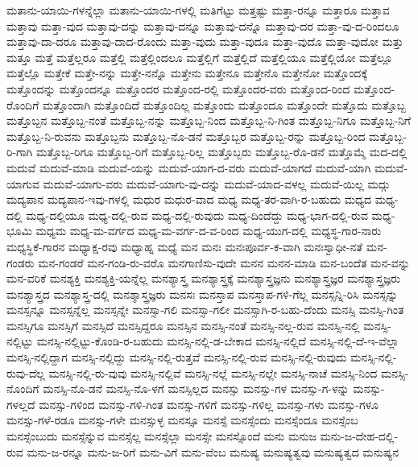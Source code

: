 {ಮತಾನು-ಯಾಯಿ-ಗಳನ್ನೆಲ್ಲಾ
ಮತಾನು-ಯಾಯಿ-ಗಳಲ್ಲಿ
ಮತಿಗೆಟ್ಟು
ಮತ್ತಷ್ಟು
ಮತ್ತಾ-ರನ್ನೂ
ಮತ್ತಾರೂ
ಮತ್ತಾವ
ಮತ್ತಾವು
ಮತ್ತಾ-ವುದ
ಮತ್ತಾವು-ದನ್ನು
ಮತ್ತಾವು-ದನ್ನೂ
ಮತ್ತಾವು-ದನ್ನೊ
ಮತ್ತಾವು-ದರ
ಮತ್ತಾ-ವು-ದ-ರಿಂದಲೂ
ಮತ್ತಾವು-ದಾ-ದರೂ
ಮತ್ತಾವು-ದಾದ-ರೊಂದು
ಮತ್ತಾ-ವುದು
ಮತ್ತಾ-ವುದೂ
ಮತ್ತಾ-ವುದೊ
ಮತ್ತಾ-ವುದೋ
ಮತ್ತು
ಮತ್ತೂ
ಮತ್ತೆ
ಮತ್ತೆಲ್ಲರೂ
ಮತ್ತೆಲ್ಲಿ
ಮತ್ತೆಲ್ಲಿಂದಲೂ
ಮತ್ತೆಲ್ಲಿಗೆ
ಮತ್ತೆಲ್ಲಿದೆ
ಮತ್ತೆಲ್ಲಿಯೂ
ಮತ್ತೆಲ್ಲಿಯೋ
ಮತ್ತೆಲ್ಲೂ
ಮತ್ತೆಲ್ಲೊ
ಮತ್ತೇಕೆ
ಮತ್ತೇ-ನನ್ನು
ಮತ್ತೇ-ನನ್ನೊ
ಮತ್ತೇನು
ಮತ್ತೇನೂ
ಮತ್ತೇನೊ
ಮತ್ತೇನೋ
ಮತ್ತೊಂದಕ್ಕೆ
ಮತ್ತೊಂದನ್ನು
ಮತ್ತೊಂದನ್ನೂ
ಮತ್ತೊಂದರ
ಮತ್ತೊಂದ-ರಲ್ಲಿ
ಮತ್ತೊಂದರ-ವರು
ಮತ್ತೊಂದ-ರಿಂದ
ಮತ್ತೊಂದ-ರೊಂದಿಗೆ
ಮತ್ತೊಂದಾಗಿ
ಮತ್ತೊಂದಿದೆ
ಮತ್ತೊಂದಿಲ್ಲ
ಮತ್ತೊಂದು
ಮತ್ತೊಂದೂ
ಮತ್ತೊಂದೇ
ಮತ್ತೊದು
ಮತ್ತೊಬ್ಬ
ಮತ್ತೊಬ್ಬನ
ಮತ್ತೊಬ್ಬ-ನಂತೆ
ಮತ್ತೊಬ್ಬ-ನನ್ನು
ಮತ್ತೊಬ್ಬ-ನಿಂದ
ಮತ್ತೊಬ್ಬ-ನಿ-ಗಿಂತ
ಮತ್ತೊಬ್ಬ-ನಿಗೂ
ಮತ್ತೊಬ್ಬ-ನಿಗೆ
ಮತ್ತೊಬ್ಬ-ನಿ-ರುವನು
ಮತ್ತೊಬ್ಬನು
ಮತ್ತೊಬ್ಬ-ನೊ-ಡನೆ
ಮತ್ತೊಬ್ಬರ
ಮತ್ತೊಬ್ಬ-ರನ್ನು
ಮತ್ತೊಬ್ಬ-ರಿಂದ
ಮತ್ತೊಬ್ಬ-ರಿ-ಗಾಗಿ
ಮತ್ತೊಬ್ಬ-ರಿಗೂ
ಮತ್ತೊಬ್ಬ-ರಿಗೆ
ಮತ್ತೊಬ್ಬ-ರಿಲ್ಲ
ಮತ್ತೊಬ್ಬರು
ಮತ್ತೊಬ್ಬ-ರೊ-ಡನೆ
ಮತ್ತೊಮ್ಮೆ
ಮದ-ದಲ್ಲಿ
ಮದುವೆ
ಮದುವೆ-ಮಾಡಿ
ಮದುವೆ-ಯನ್ನು
ಮದುವೆ-ಯಾಗ-ದ-ವರು
ಮದುವೆ-ಯಾಗದೆ
ಮದುವೆ-ಯಾಗಿ
ಮದುವೆ-ಯಾಗುವ
ಮದುವೆ-ಯಾಗು-ವರು
ಮದುವೆ-ಯಾಗು-ವು-ದನ್ನು
ಮದುವೆ-ಯಾದ-ವಳಲ್ಲ
ಮದುವೆ-ಯಿಲ್ಲ
ಮದ್ಗು
ಮದ್ಯಪಾನ
ಮದ್ಯಪಾನ-ಇವು-ಗಳಲ್ಲಿ
ಮಧುರ
ಮಧುರ-ವಾದ
ಮಧ್ಯ
ಮಧ್ಯ-ತರ-ವಾಗಿ-ರ-ಬಹುದು
ಮಧ್ಯದ
ಮಧ್ಯ-ದಲ್ಲಿ
ಮಧ್ಯ-ದಲ್ಲಿಯೂ
ಮಧ್ಯ-ದಲ್ಲಿ-ರುವ
ಮಧ್ಯ-ದಲ್ಲಿ-ರುವುದು
ಮಧ್ಯ-ದಿಂದೆದ್ದು
ಮಧ್ಯ-ಭಾಗ-ದಲ್ಲಿ-ರುವ
ಮಧ್ಯ-ಭೂಮಿ
ಮಧ್ಯಮ
ಮಧ್ಯ-ಮ-ವರ್ಗದ
ಮಧ್ಯ-ಮ-ವರ್ಗ-ದ-ವ-ರಿಂದ
ಮಧ್ಯ-ಯುಗ-ದಲ್ಲಿ
ಮಧ್ಯಸ್ಥ-ಗಾರ-ನಾರು
ಮಧ್ಯಸ್ಥಿಕೆ-ಗಾರನ
ಮಧ್ಯಾಕ್ಷ-ರವು
ಮಧ್ಯಾಹ್ನ
ಮಧ್ಯೆ
ಮನ
ಮನಃ
ಮನಃಪೂರ್ವ-ಕ-ವಾಗಿ
ಮನಃಸ್ವಾಧೀ-ನತೆ
ಮನ-ಗಂಡರು
ಮನ-ಗಂಡರೆ
ಮನ-ಗಂಡಿ-ರು-ವರೊ
ಮನಗಾಣಿಸು-ವುದೇ
ಮನನ
ಮನನ-ಮಾಡಿ
ಮನ-ಬಂದೆತ
ಮನ-ವನ್ನು
ಮನ-ವರಿಕೆ
ಮನಶ್ಯಕ್ತಿ
ಮನಶ್ಯಕ್ತಿ-ಯನ್ನೆಲ್ಲ
ಮನಶ್ಯಾಸ್ತ್ರ
ಮನಶ್ಯಾಸ್ತ್ರಕ್ಕೆ
ಮನಶ್ಯಾಸ್ತ್ರಜ್ಞನು
ಮನಶ್ಯಾಸ್ತ್ರಜ್ಞರ
ಮನಶ್ಯಾಸ್ತ್ರಜ್ಞರು
ಮನಶ್ಯಾಸ್ತ್ರದ
ಮನಶ್ಯಾಸ್ತ್ರ-ದಲ್ಲಿ
ಮನಶ್ಶಾಸ್ತ್ರಜ್ಞರು
ಮನಸಃ
ಮನಸ್ತಾಪ
ಮನಸ್ತಾಪ-ಗಳಿ-ಗೆಲ್ಲ
ಮನಸ್ಸನ್ನಿ-ರಿಸಿ
ಮನಸ್ಸನ್ನು
ಮನಸ್ಸನ್ನೂ
ಮನಸ್ಸನ್ನೆಲ್ಲ
ಮನಸ್ಸನ್ನೇ
ಮನಸ್ಸಾ-ಗಲಿ
ಮನಸ್ಸಾ-ಗಲೀ
ಮನಸ್ಸಾಗಿ-ರ-ಬಹು-ದೆಂದು
ಮನಸ್ಸಿ
ಮನಸ್ಸಿ-ಗಿಂತ
ಮನಸ್ಸಿಗೂ
ಮನಸ್ಸಿಗೆ
ಮನಸ್ಸಿದೆ
ಮನಸ್ಸಿದ್ದರೂ
ಮನಸ್ಸಿನ
ಮನಸ್ಸಿ-ನಂತೆ
ಮನಸ್ಸಿ-ನಲ್ಲ-ರುವ
ಮನಸ್ಸಿ-ನಲ್ಲಿ
ಮನಸ್ಸಿ-ನಲ್ಲಿಟ್ಟು
ಮನಸ್ಸಿ-ನಲ್ಲಿಟ್ಟು-ಕೊಂಡಿ-ರ-ಬಹುದು
ಮನಸ್ಸಿ-ನಲ್ಲಿ-ಡ-ಬೇಕಾದ
ಮನಸ್ಸಿ-ನಲ್ಲಿದೆ
ಮನಸ್ಸಿ-ನಲ್ಲಿ-ದೆ-ಇ-ವೆಲ್ಲಾ
ಮನಸ್ಸಿ-ನಲ್ಲಿದ್ದಾಗ
ಮನಸ್ಸಿ-ನಲ್ಲಿದ್ದು
ಮನಸ್ಸಿ-ನಲ್ಲಿ-ರುತ್ತವೆ
ಮನಸ್ಸಿ-ನಲ್ಲಿ-ರುವ
ಮನಸ್ಸಿ-ನಲ್ಲಿ-ರುವುದು
ಮನಸ್ಸಿ-ನಲ್ಲಿ-ರುವು-ದೆಲ್ಲ
ಮನಸ್ಸಿ-ನಲ್ಲಿ-ರು-ವುವು
ಮನಸ್ಸಿ-ನಲ್ಲಿವೆ
ಮನಸ್ಸಿ-ನಲ್ಲೆ
ಮನಸ್ಸಿ-ನಲ್ಲೇ
ಮನಸ್ಸಿ-ನಾಚೆ
ಮನಸ್ಸಿ-ನಿಂದ
ಮನಸ್ಸಿ-ನೊಂದಿಗೆ
ಮನಸ್ಸಿ-ನೊ-ಡನೆ
ಮನಸ್ಸಿ-ನೊ-ಳಗೆ
ಮನಸ್ಸಿಲ್ಲದ
ಮನಸ್ಸು
ಮನಸ್ಸು-ಗಳ
ಮನಸ್ಸು-ಗ-ಳನ್ನು
ಮನಸ್ಸು-ಗಳಲ್ಲದೆ
ಮನಸ್ಸು-ಗಳಿಂದ
ಮನಸ್ಸು-ಗಳಿ-ಗಿಂತ
ಮನಸ್ಸು-ಗಳಿಗೆ
ಮನಸ್ಸು-ಗಳಿಲ್ಲ
ಮನಸ್ಸು-ಗಳು
ಮನಸ್ಸು-ಗಳೂ
ಮನಸ್ಸು-ಗಳೆ-ರಡೂ
ಮನಸ್ಸು-ಗಳೇ
ಮನಸ್ಸುಳ್ಳ
ಮನಸ್ಸೂ
ಮನಸ್ಸೆ
ಮನಸ್ಸೆಂದು
ಮನಸ್ಸೆಂದೂ
ಮನಸ್ಸೆಂಬ
ಮನಸ್ಸೆಂಬುದು
ಮನಸ್ಸೆನ್ನುವ
ಮನಸ್ಸೆಲ್ಲ
ಮನಸ್ಸೆಲ್ಲಾ
ಮನಸ್ಸೇ
ಮನಸ್ಸೊಂದೆ
ಮನು
ಮನುಜ
ಮನು-ಜ-ದೇಹ-ದಲ್ಲಿ-ರುವ
ಮನು-ಜ-ರನ್ನೂ
ಮನು-ಜ-ರಿಗೆ
ಮನು-ವಿಗೆ
ಮನು-ವೆಂಬ
ಮನುಷ್ಯ
ಮನುಷ್ಯತ್ವವು
ಮನುಷ್ಯತ್ವದ
ಮನುಷ್ಯನ
}
